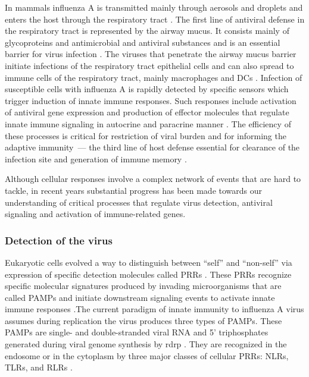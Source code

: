 	In mammals influenza A is transmitted mainly through aerosols and droplets and enters the host through the respiratory tract \parencite{Brankston2007}. The first line of antiviral defense in the respiratory tract is represented by the airway mucus. It consists mainly of glycoproteins and antimicrobial and antiviral substances and is an essential barrier for virus infection \parencite{Thornton2008, Nicholas2006}. The viruses that penetrate the airway mucus barrier initiate infections of the respiratory tract epithelial cells and can also spread to immune cells of the respiratory tract, mainly macrophages and \glspl{DC} \parencite{Perrone2008, Bender1998}. Infection of susceptible cells with influenza A is rapidly detected by specific sensors which trigger induction of innate immune responses. Such responses include activation of antiviral gene expression and production of effector molecules that regulate innate immune signaling in autocrine and paracrine manner \parencite{Iwasaki2014}. The efficiency of these processes is critical for restriction of viral burden and for informing the adaptive immunity~--- the third line of host defense essential for clearance of the infection site and generation of immune memory \parencite{Iwasaki2010}. 
	
	Although cellular responses involve a complex network of events that are hard to tackle, in recent years substantial progress has been made towards our understanding of critical processes that regulate virus detection, antiviral signaling and activation of immune-related genes.
	
		\subsubsection{Detection of the virus}
		
		Eukaryotic cells evolved a way to distinguish between ``self'' and ``non-self'' via expression of specific detection molecules called \glspl{PRR} \parencite{Janeway2002}. These \glspl{PRR} recognize specific molecular signatures produced by invading microorganisms that are called  \glspl{PAMP} and initiate downstream signaling events to activate innate immune responses \parencite{Janeway1989}.The current paradigm of innate immunity to influenza A virus assumes during replication the virus produces three types of  \glspl{PAMP}. These \glspl{PAMP} are single- and double-stranded viral RNA and 5' triphosphates generated during viral genome synthesis by \gls{rdrp} \parencite{Guillot2005, Hornung2006, Kato2006, Lund2004}. They are recognized in the endosome or in the cytoplasm by three major classes of cellular \glspl{PRR}: \glspl{NLR}, \glspl{TLR}, and \glspl{RLR} \parencite{Iwasaki2014}. 
		
